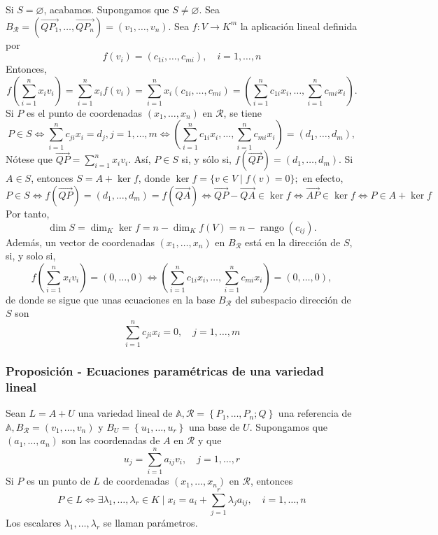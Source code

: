 \documentclass[12pt, a4paper, ones, notitlepage, openany,titlepage]{article}
\begin{document}
\noindent Si $S = \varnothing$, acabamos. Supongamos que $S \neq \varnothing$. Sea $B_\mathcal{R} = \left(\overrightarrow{QP_1},\ldots,\overrightarrow{QP_n}\right) = (v_1,\ldots,v_n)$. Sea $f: V \rightarrow K^{m}$ la aplicación lineal definida por
$$
f\left(v_{i}\right)=\left(c_{1 i}, \ldots, c_{m i}\right), \quad i=1, \ldots, n
$$
Entonces,
$$
f\left(\sum_{i=1}^{n} x_{i} v_{i}\right)=\sum_{i=1}^{n}x_if(v_i)=\sum_{i=1}^{n}x_i(c_{1i},\ldots,c_{mi})=\left(\sum_{i=1}^{n} c_{1 i} x_{i}, \ldots, \sum_{i=1}^{n} c_{m i} x_{i}\right) .
$$
Si $P$ es el punto de coordenadas $\left(x_{1}, \ldots, x_{n}\right)$ en $\mathcal{R}$, se tiene
$$
P \in S \Longleftrightarrow \sum_{i=1}^{n} c_{j i} x_{i}=d_{j}, j=1, \ldots, m \Longleftrightarrow\left(\sum_{i=1}^{n} c_{1 i} x_{i}, \ldots, \sum_{i=1}^{n} c_{m i} x_{i}\right)=\left(d_{1}, \ldots, d_{m}\right),
$$
Nótese que $\displaystyle \overrightarrow{QP} = \sum_{i=1}^{n} x_i v_i$. Así, $P \in S$ si, y sólo si, $f(\overrightarrow{Q P})=\left(d_{1}, \ldots, d_{m}\right)$. Si $A \in S$, entonces $S=A+\ker f$, donde $\ker f=\{v \in V \mid f(v)=0\} ;$ en efecto,
$$
P \in S \Longleftrightarrow f(\overrightarrow{Q P})=\left(d_{1}, \ldots, d_{m}\right)=f(\overrightarrow{Q A}) \Longleftrightarrow \overrightarrow{Q P}-\overrightarrow{Q A} \in \ker f \Longleftrightarrow \overrightarrow{A P} \in \ker f \Longleftrightarrow P \in A+\ker f
$$
Por tanto,
$$
\dim  S=\dim _{K} \ker f=n-\dim _{K} f(V)=n-\operatorname{rango}\left(c_{i j}\right) .
$$
\noindent Además, un vector de coordenadas $\left(x_{1}, \ldots, x_{n}\right)$ en $B_{\mathcal{R}}$ está en la dirección de $S$, si, y solo si,
$$
f\left(\sum_{i=1}^{n} x_{i} v_{i}\right)=(0, \ldots, 0) \Longleftrightarrow\left(\sum_{i=1}^{n} c_{1 i} x_{i}, \ldots, \sum_{i=1}^{n} c_{m i} x_{i}\right)=(0, \ldots, 0),
$$
\noindent de donde se sigue que unas ecuaciones en la base $B_{\mathcal{R}}$ del subespacio dirección de $S$ son
$$
\sum_{i=1}^{n} c_{j i} x_{i}=0, \quad j=1, \ldots, m
$$

\subsubsection{Proposición - Ecuaciones paramétricas de una variedad lineal}
Sean $L=A+U$ una variedad lineal de $\mathbb{A}, \mathcal{R}=\left\{P_{1}, \ldots, P_{n} ; Q\right\}$ una referencia de $\mathbb{A}, B_{\mathcal{R}}=\left(v_{1}, \ldots, v_{n}\right)$ y $B_{U}=\left\{u_{1}, \ldots, u_{r}\right\}$ una base de $U$. Supongamos que $\left(a_{1}, \ldots, a_{n}\right)$ son las coordenadas de $A$ en $\mathcal{R}$ y que
$$
u_{j}=\sum_{i=1}^{n} a_{i j} v_{i}, \quad j=1, \ldots, r
$$
\noindent Si $P$ es un punto de $L$ de coordenadas $\left(x_{1}, \ldots, x_{n}\right)$ en $\mathcal{R}$, entonces
$$
P \in L \Longleftrightarrow \exists \lambda_{1}, \ldots, \lambda_{r} \in K \mid x_{i}=a_{i}+\sum_{j=1}^{r} \lambda_{j} a_{i j}, \quad i=1, \ldots, n
$$
\noindent Los escalares $\lambda_{1}, \ldots, \lambda_{r}$ se llaman parámetros.
\end{document}

